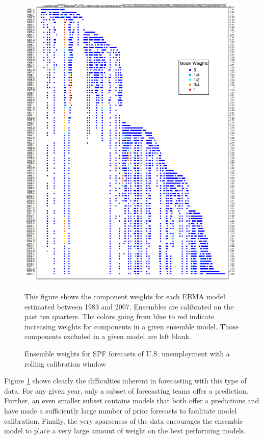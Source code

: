 \documentclass[12pt,fullpage,endnotes]{article}
\begin{document}
\begin{figure}[h]
  \caption{Ensemble weights for SPF forecasts of U.S. unemployment
    with a rolling calibration window}
\label{modelWeights}
\begin{center}
\includegraphics[scale=.95]{awesome}
\end{center}

\footnotesize This figure shows the component weights for each EBMA
model estimated between 1983 and 2007. Ensembles are calibrated on the
past ten quarters. The colors going from blue to red indicate
increasing weights for components in a given ensemble model. Those
components excluded in a given model are left blank.

\end{figure}

Figure \ref{modelWeights} shows clearly the difficulties inherent in
forecasting with this type of data.  For any given year, only a subset
of forecasting teams offer a prediction.  Further, an even smaller
subset contains models that both offer a predictions and have made a
sufficiently large number of prior forecasts to facilitate model
calibration.  Finally, the very sparseness of the data encourages the
ensemble model to place a very large amount of weight on the best
performing models.  
\end{document}
